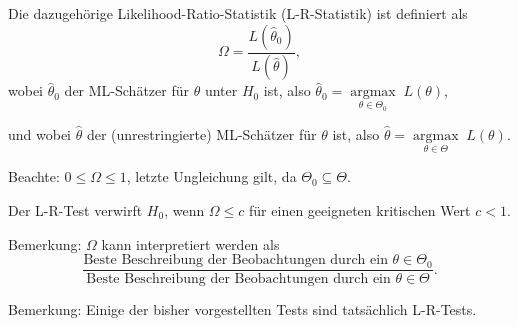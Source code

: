 \documentclass{tstextbook}
\DeclareMathOperator{\argmax}{argmax}
\begin{document}
Die dazugehörige Likelihood-Ratio-Statistik (L-R-Statistik)  ist definiert als 
\[
\Omega = \frac{L(\hat{\theta}_0)}{L(\hat{\theta})}, 
\] wobei $ \hat{\theta}_0 $ der ML-Schätzer für $ \theta $ unter $ H_0 $ ist, also $ \hat{\theta}_0 = \underset{\theta\in\Theta_0}{\argmax} \; L(\theta) $, 

und wobei $ \hat{\theta} $ der (unrestringierte) ML-Schätzer für $ \theta $ ist, also $ \hat{\theta} = \underset{\theta\in\Theta}{\argmax} \; L(\theta) $.

\begin{remark}
Beachte: $ 0\le\Omega\le 1 $, letzte Ungleichung gilt, da $ \Theta_0\subseteq\Theta $.
\end{remark}

Der L-R-Test verwirft $ H_0 $, wenn $ \Omega\le c $ für einen geeigneten kritischen Wert $ c<1 $.

\begin{remark}
	Bemerkung: $ \Omega $ kann interpretiert werden als 
	\[
	\frac{\text{Beste Beschreibung der Beobachtungen durch ein }\theta\in\Theta_0}{\text{Beste Beschreibung der Beobachtungen durch ein }\theta\in\Theta}.
	\]
\end{remark}

\begin{remark}
	Bemerkung: Einige der bisher vorgestellten Tests sind tatsächlich L-R-Tests.
\end{remark}
\end{document}
